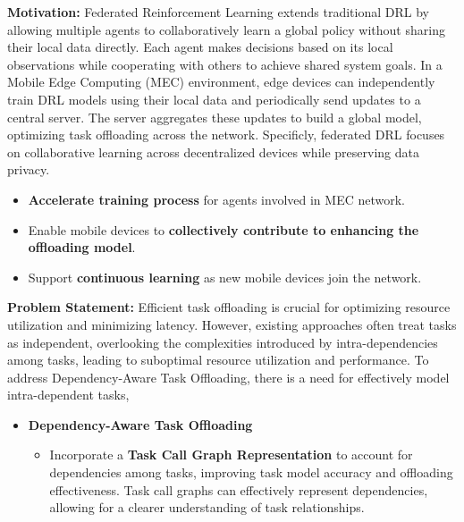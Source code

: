 \documentclass[12pt]{article}
\begin{document}
\noindent\textbf{\large Motivation:  } 
Federated Reinforcement Learning extends traditional DRL by allowing multiple agents to collaboratively learn a global policy without sharing their local data directly. Each agent makes decisions based on its local observations while cooperating with others to achieve shared system goals. In a Mobile Edge Computing (MEC) environment, edge devices can independently train DRL models using their local data and periodically send updates to a central server. The server aggregates these updates to build a global model, optimizing task offloading across the network. Specificly, federated DRL focuses on collaborative learning across decentralized devices while preserving data privacy. 
\vspace{-2mm}
\begin{itemize}

		\item \textbf{Accelerate training process} for agents involved in MEC network. \vspace{-2mm}
		\item Enable mobile devices to  \textbf{collectively contribute to enhancing the offloading model}.\vspace{-2mm}
		\item Support  \textbf{continuous learning} as new mobile devices join the network.\vspace{-2mm}
\end{itemize}

\vspace{3mm}

\noindent\textbf{\large Problem Statement: }
Efficient task offloading is crucial for optimizing resource utilization and minimizing latency. However, existing approaches often treat tasks as independent, overlooking the complexities introduced by intra-dependencies among tasks, leading to suboptimal resource utilization and performance. To address Dependency-Aware Task Offloading, there is a need for effectively model intra-dependent tasks,
\vspace{-1mm}
	\begin{itemize}
	\item \textbf{Dependency-Aware Task Offloading}\vspace{-2mm}
	\begin{itemize}
		\item Incorporate a \textbf{Task Call Graph Representation} to account for dependencies among tasks, improving task model accuracy and offloading effectiveness. Task call graphs can effectively represent dependencies, allowing for a clearer understanding of task relationships. 
	\end{itemize}\vspace{-3mm}


\end{itemize}
\end{document}
